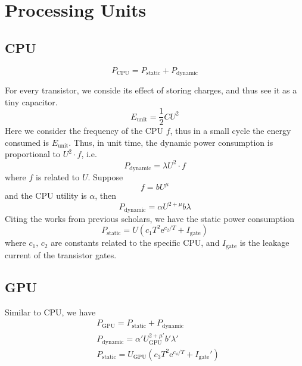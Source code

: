\documentclass[12pt]{article}
\begin{document}
\section{Processing Units}

\subsection{CPU}

\begin{equation}
	P_\mathrm{CPU}=P_\mathrm{static}+P_\mathrm{dynamic}
\end{equation}

For every transistor, we conside its effect of storing charges, and thus see it as a tiny capacitor. 
\begin{equation}
	E_\mathrm {unit}=\frac{1}{2}CU^2
\end{equation}
Here we consider the frequency of the CPU $f$, thus in a small cycle the energy consumed is $E_\mathrm{unit}$. Thus, in unit time, the dynamic power consumption is proportional to $U^2\cdot f$, i.e.
\begin{equation}
	P_\mathrm{dynamic}=\lambda U^2\cdot f
\end{equation}
where $f$ is related to $U$. Suppose 
\begin{equation}
	f=b U^\mu
\end{equation}
and the CPU utility is $\alpha$, then
\begin{equation}
	P_\mathrm{dynamic}=\alpha U^{2+\mu}b\lambda
\end{equation}
Citing the works from previous scholars, we have the static power consumption
\begin{equation}
	P_\mathrm{static}=U\left(c_1T^2\mathrm e^{c_2/T}+I_\mathrm{gate}\right)
\end{equation}
where $c_1,\,c_2$ are constants related to the specific CPU, and $I_\mathrm{gate}$ is the leakage current of the transistor gates.

\subsection{GPU}
Similar to CPU, we have
\begin{eqnarray}
	& P_\mathrm{GPU}=P_\mathrm{static}+P_\mathrm{dynamic} \\
	& P_\mathrm{dynamic}=\alpha' U_\mathrm{GPU}^{2+\mu'}b'\lambda' \\
	& P_\mathrm{static}=U_\mathrm{GPU}\left(c_3T^2\mathrm e^{c_4/T}+I_\mathrm{gate}'\right)
\end{eqnarray}
\end{document}
